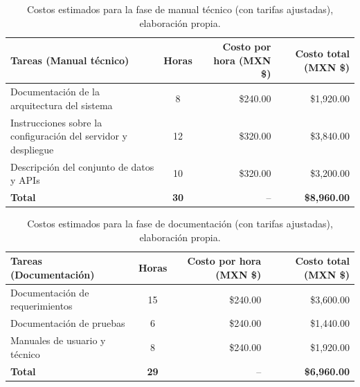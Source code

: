\begin{table}[H]
	\centering
	\renewcommand{\arraystretch}{1.6}
	\setlength{\tabcolsep}{10pt}
	\Huge
	\begin{adjustbox}{max width=\textwidth}
		\begin{tabular}{|p{9.5cm}|c|r|r|}
			\hline
			\textbf{Tareas (Manual técnico)} & \textbf{Horas} & \textbf{Costo por hora (MXN \$)} & \textbf{Costo total (MXN \$)} \\ \hline
			Documentación de la arquitectura del sistema & 8 & \$240.00 & \$1,920.00 \\ \hline
			Instrucciones sobre la configuración del servidor y despliegue & 12 & \$320.00 & \$3,840.00 \\ \hline
			Descripción del conjunto de datos y APIs & 10 & \$320.00 & \$3,200.00 \\ \hline
			\textbf{Total} & \textbf{30} & -- & \textbf{\$8,960.00} \\ \hline
		\end{tabular}
	\end{adjustbox}
	\caption[Costos estimados para la fase de manual técnico (con tarifas ajustadas)]{Costos estimados para la fase de manual técnico (con tarifas ajustadas), elaboración propia.} 
	\label{tab:costos_manual_tecnico_actualizado}
\end{table}

\begin{table}[H]
	\centering
	\renewcommand{\arraystretch}{1.6}
	\setlength{\tabcolsep}{10pt}
	\Huge
	\begin{adjustbox}{max width=\textwidth}
		\begin{tabular}{|p{9.5cm}|c|r|r|}
			\hline
			\textbf{Tareas (Documentación)} & \textbf{Horas} & \textbf{Costo por hora (MXN \$)} & \textbf{Costo total (MXN \$)} \\ \hline
			Documentación de requerimientos & 15 & \$240.00 & \$3,600.00 \\ \hline
			Documentación de pruebas & 6 & \$240.00 & \$1,440.00 \\ \hline
			Manuales de usuario y técnico & 8 & \$240.00 & \$1,920.00 \\ \hline
			\textbf{Total} & \textbf{29} & -- & \textbf{\$6,960.00} \\ \hline
		\end{tabular}
	\end{adjustbox}
	\caption[Costos estimados para la fase de documentación (con tarifas ajustadas)]{Costos estimados para la fase de documentación (con tarifas ajustadas), elaboración propia.} 
	\label{tab:costos_documentacion_actualizado}
\end{table}


